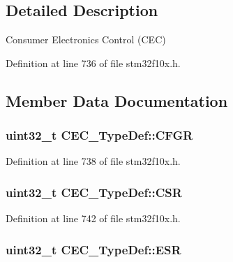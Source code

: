 \subsection{Detailed Description}
Consumer Electronics Control (C\+EC) 

Definition at line 736 of file stm32f10x.\+h.



\subsection{Member Data Documentation}
\subsubsection[{\texorpdfstring{C\+F\+GR}{CFGR}}]{ {\bf uint32\+\_\+t} C\+E\+C\+\_\+\+Type\+Def\+::\+C\+F\+GR}\hypertarget{struct_c_e_c___type_def_a91a55cd277c20e5c5ad228fd9013d014}{}\label{struct_c_e_c___type_def_a91a55cd277c20e5c5ad228fd9013d014}


Definition at line 738 of file stm32f10x.\+h.

\subsubsection[{\texorpdfstring{C\+SR}{CSR}}]{ {\bf uint32\+\_\+t} C\+E\+C\+\_\+\+Type\+Def\+::\+C\+SR}\hypertarget{struct_c_e_c___type_def_ad9aa13645f701c5457fbf51a9ecf7aa4}{}\label{struct_c_e_c___type_def_ad9aa13645f701c5457fbf51a9ecf7aa4}


Definition at line 742 of file stm32f10x.\+h.

\subsubsection[{\texorpdfstring{E\+SR}{ESR}}]{ {\bf uint32\+\_\+t} C\+E\+C\+\_\+\+Type\+Def\+::\+E\+SR}\hypertarget{struct_c_e_c___type_def_a90adcbf5ee626747170b2f208770628f}{}\label{struct_c_e_c___type_def_a90adcbf5ee626747170b2f208770628f}


